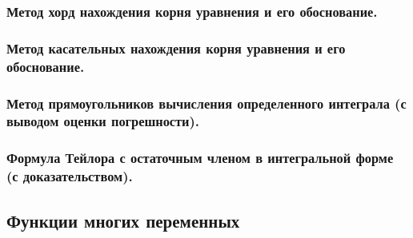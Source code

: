 \documentclass[10pt]{article}
\begin{document}
    \subsubsection{Метод хорд нахождения корня уравнения и его обоснование.}



    \subsubsection{Метод касательных нахождения корня уравнения и его обоснование.}



    \subsubsection{Метод прямоугольников вычисления определенного интеграла (с выводом оценки погрешности).}



    \subsubsection{Формула Тейлора с остаточным членом в интегральной форме (с доказательством).}



    \subsection{Функции многих переменных}
\end{document}
